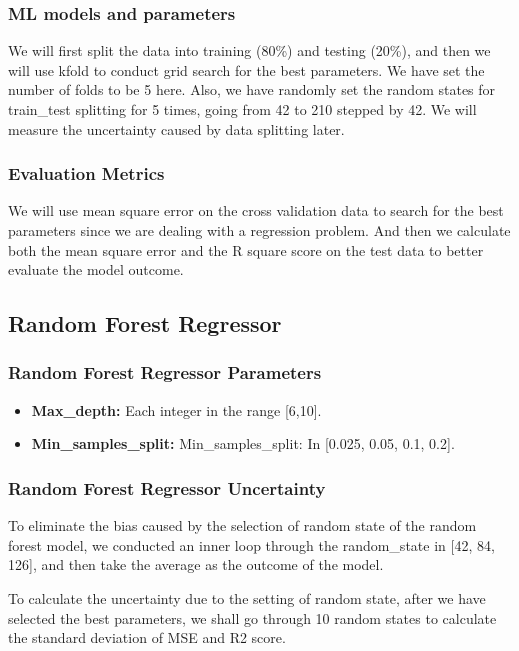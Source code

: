 \documentclass{article}
\begin{document}
\subsubsection{ML models and parameters}
We will first split the data into training (80\%) and testing (20\%), and then we will use kfold to conduct grid search for the best parameters. We have set the number of folds to be 5 here. Also, we have randomly set the random states for train\_test splitting for 5 times, going from 42 to 210 stepped by 42. We will measure the uncertainty caused by data splitting later.
\subsubsection{Evaluation Metrics}
We will use mean square error on the cross validation data to search for the best parameters since we are dealing with a regression problem. And then we calculate both the mean square error and the R square score on the test data to better evaluate the model outcome.

\subsection{Random Forest Regressor}

\subsubsection{Random Forest Regressor Parameters}
\begin{itemize}
\item \textbf{Max\_depth:}
Each integer in the range [6,10].
\item \textbf{Min\_samples\_split:}
Min\_samples\_split: In [0.025, 0.05, 0.1, 0.2].
\end{itemize}

\subsubsection{Random Forest Regressor Uncertainty}
To eliminate the bias caused by the selection of random state of the random forest model, we conducted an inner loop through the random\_state in [42, 84, 126], and then take the average as the outcome of the model. \par
To calculate the uncertainty due to the setting of random state, after we have selected the best parameters, we shall go through 10 random states to calculate the standard deviation of MSE and R2 score.
\end{document}

